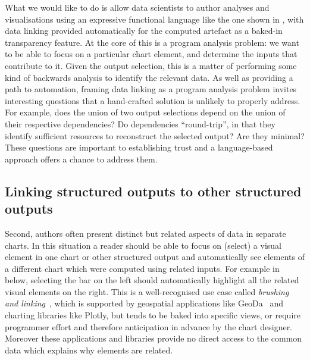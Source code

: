 What we would like to do is allow data scientists to author analyses and visualisations using an expressive functional language like the one shown in , with data linking provided automatically for the computed artefact as a baked-in transparency feature. At the core of this is a program analysis problem: we want to be able to focus on a particular chart element, and determine the inputs that contribute to it. Given the output selection, this is a matter of performing some kind of backwards analysis to identify the relevant data. As well as providing a path to automation, framing data linking as a program analysis problem invites interesting questions that a hand-crafted solution is unlikely to properly address. For example, does the union of two output selections depend on the union of their respective dependencies? Do dependencies ``round-trip'', in that they identify sufficient resources to reconstruct the selected output? Are they minimal? These questions are important to establishing trust and a language-based approach offers a chance to address them.

\subsection{Linking structured outputs to other structured outputs}
\label{sec:introduction:vis-linking}

Second, authors often present distinct but related aspects of data in separate charts. In this situation a reader should be able to focus on (select) a visual element in one chart or other structured output and automatically see elements of a different chart which were computed using related inputs. For example in  below, selecting the bar on the left should automatically highlight all the related visual elements on the right. This is a well-recognised use case called \emph{brushing and linking}~\cite{becker87}, which is supported by geospatial applications like GeoDa~\cite{anselin06} and charting libraries like Plotly, but tends to be baked into specific views, or require programmer effort and therefore anticipation in advance by the chart designer. Moreover these applications and libraries provide no direct access to the common data which explains why elements are related.

